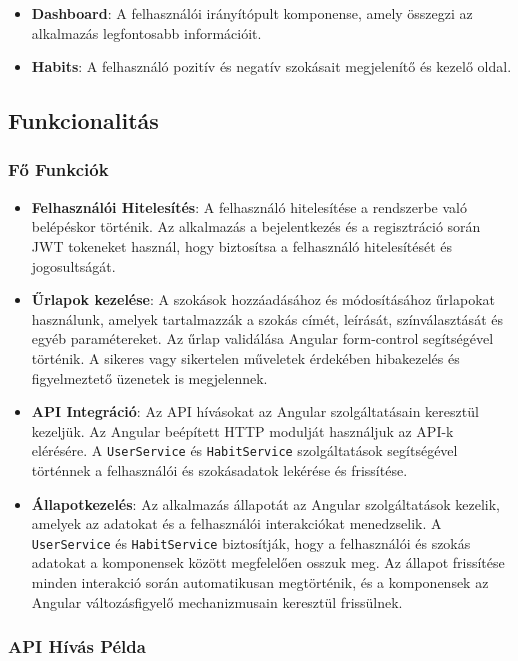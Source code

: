 \documentclass[12pt]{report}
\begin{document}
\begin{itemize}
  \item \textbf{Dashboard}: A felhasználói irányítópult komponense, amely összegzi az alkalmazás legfontosabb információit.
  \item \textbf{Habits}: A felhasználó pozitív és negatív szokásait megjelenítő és kezelő oldal.
\end{itemize}

\subsection{Funkcionalitás}

\subsubsection{Fő Funkciók}
\begin{itemize}
  \item \textbf{Felhasználói Hitelesítés}: A felhasználó hitelesítése a rendszerbe való belépéskor történik. Az alkalmazás a bejelentkezés és a regisztráció során JWT tokeneket használ, hogy biztosítsa a felhasználó hitelesítését és jogosultságát.
  \item \textbf{Űrlapok kezelése}: A szokások hozzáadásához és módosításához űrlapokat használunk, amelyek tartalmazzák a szokás címét, leírását, színválasztását és egyéb paramétereket. Az űrlap validálása Angular form-control segítségével történik. A sikeres vagy sikertelen műveletek érdekében hibakezelés és figyelmeztető üzenetek is megjelennek.
  \item \textbf{API Integráció}: Az API hívásokat az Angular szolgáltatásain keresztül kezeljük. Az Angular beépített HTTP modulját használjuk az API-k elérésére. A \texttt{UserService} és \texttt{HabitService} szolgáltatások segítségével történnek a felhasználói és szokásadatok lekérése és frissítése.
  \item \textbf{Állapotkezelés}: Az alkalmazás állapotát az Angular szolgáltatások kezelik, amelyek az adatokat és a felhasználói interakciókat menedzselik. A \texttt{UserService} és \texttt{HabitService} biztosítják, hogy a felhasználói és szokás adatokat a komponensek között megfelelően osszuk meg. Az állapot frissítése minden interakció során automatikusan megtörténik, és a komponensek az Angular változásfigyelő mechanizmusain keresztül frissülnek.
\end{itemize}

\subsubsection{API Hívás Példa}
\end{document}
